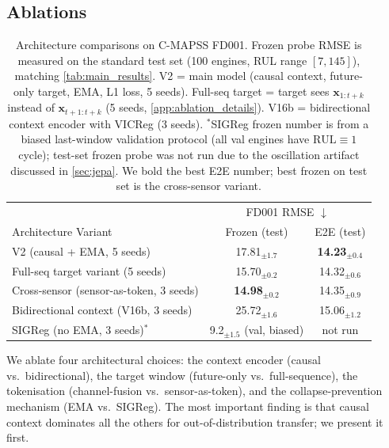 \documentclass{article}
\newcommand{\x}{\mathbf{x}}
\newcommand{\rul}{\text{RUL}}
\begin{document}
\subsection{Ablations}
\label{sec:ablations}

\begin{table}[t]
\centering
\caption{Architecture comparisons on C-MAPSS FD001. Frozen probe RMSE is measured on the standard test set (100 engines, RUL range $[7, 145]$), matching \cref{tab:main_results}. V2 = main model (causal context, future-only target, EMA, L1 loss, 5 seeds). Full-seq target = target sees $\x_{1:t+k}$ instead of $\x_{t+1:t+k}$ (5 seeds, \cref{app:ablation_details}). V16b = bidirectional context encoder with VICReg (3 seeds). $^*$SIGReg frozen number is from a biased last-window validation protocol (all val engines have $\rul \equiv 1$ cycle); test-set frozen probe was not run due to the oscillation artifact discussed in \cref{sec:jepa}. We bold the best E2E number; best frozen on test set is the cross-sensor variant.}
\label{tab:ablation}
\small
\begin{tabular}{@{}l|cc@{}}
\toprule
& \multicolumn{2}{c}{FD001 RMSE $\downarrow$} \\
Architecture Variant & Frozen (test) & E2E (test) \\
\midrule
V2 (causal + EMA, 5 seeds) & 17.81$_{\pm1.7}$ & \textbf{14.23}$_{\pm0.4}$ \\
Full-seq target variant (5 seeds) & 15.70$_{\pm0.2}$ & 14.32$_{\pm0.6}$ \\
Cross-sensor (sensor-as-token, 3 seeds) & \textbf{14.98}$_{\pm0.2}$ & 14.35$_{\pm0.9}$ \\
Bidirectional context (V16b, 3 seeds) & 25.72$_{\pm1.6}$ & 15.06$_{\pm1.2}$ \\
SIGReg (no EMA, 3 seeds)$^*$ & 9.2$_{\pm1.5}$ (val, biased) & not run \\
\bottomrule
\end{tabular}
\end{table}

We ablate four architectural choices: the context encoder (causal vs.\ bidirectional), the target window (future-only vs.\ full-sequence), the tokenisation (channel-fusion vs.\ sensor-as-token), and the collapse-prevention mechanism (EMA vs.\ SIGReg). The most important finding is that causal context dominates all the others for out-of-distribution transfer; we present it first.
\end{document}
